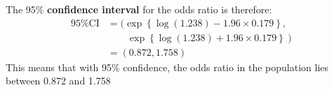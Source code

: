 \documentclass[compress, notes=hide]{beamer}
\newcommand{\hl}[1]{\textbf{#1}}
\begin{document}
\begin{frame}
\begin{block}{}
The 95\% \hl{confidence interval} for the odds ratio is therefore:
\begin{align*}
\text{95\% CI} & = ( \exp \left\{ \log(1.238)  - 1.96 \times 0.179 \right\},  \\
& \qquad \left. \exp \left\{ \log(1.238)  + 1.96 \times 0.179 \right\} \right) \\
& = (0.872,1.758)
\end{align*}
This means that with 95\% confidence, the odds ratio in the population
lies between 0.872 and 1.758
\end{block}
\end{frame}


\end{document}
